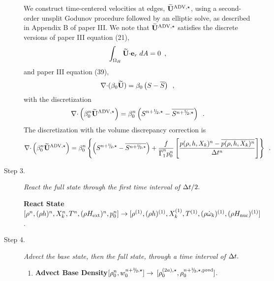 \begin{description}
We construct time-centered velocities at edges, $\widetilde{\mathbf{U}}^{\mathrm{ADV},\star}$, 
using a second-order unsplit Godunov procedure followed by an elliptic
solve, as described in Appendix B of paper III.  We note that 
$\widetilde{\mathbf{U}}^{\mathrm{ADV},\star}$ satisfies the discrete versions of paper III equation (21),
\begin{equation}
\int_{\Omega_H} \widetilde{{\bf U}} \mathbf{\cdot} \mathbf{e}_r \; dA = 0 \label{eq:udoterzero} \enskip ,
\end{equation}
and paper III equation (39),
\begin{equation}
\mathbf{\nabla} \mathbf{\cdot} (\beta_0 \widetilde{{\bf U}} )  = \beta_0 \left(S - \overline{S} \right )\enskip ,
\label{eq:tildeconstraint}
\end{equation}
with the discretization
\begin{equation}
\nablab \cdotb \left(\beta_0^n \uadvone\right) = 
\beta_0^n \left(S^{\nph,\star} - \overline{S^{\nph,\star}}\right) \enskip .
\end{equation}
The discretization with the volume discrepancy correction is
\begin{equation}
\nablab \cdotb \left(\beta_0^n \uadvone\right) = 
\beta_0^n \left\{ \left(S^{\nph,\star} - \overline{S^{\nph,\star}}\right)
+ \frac{f}{\gammabar^n p_0^n}
\left[\frac{p(\rho,h,X_k)^n - \overline{p(\rho,h,X_k)^n}}{\Delta t^n}\right]\right\} \enskip .
\end{equation}

\item[Step 3.] {\em React the full state through the first time interval of $\Delta t / 2.$}

{\bf React State}$[\rho^n, (\rho h)^n, X_k^n, T^n, (\rho{H_{\rm ext}})^n, p_0^n] \rightarrow
[ \rho^{(1)},(\rho h)^{(1)},X_k^{(1)},T^{(1)},(\rho \dot{\omega}_k)^{(1)},(\rho {H_{\rm nuc}})^{(1)} ]$.

\item[Step 4.] {\em Advect the base state, then the full state, through a time interval 
of $\Delta t.$}

\begin{enumerate}
\renewcommand{\theenumi}{{\bf \alph{enumi}}}

\item {\bf Advect Base Density}$[\rhozero^{n},w_0^{\nph,\star}] \rightarrow$ 
$[\rho_0^{(2a),\star}, \rho_0^{\nph,\star,{\rm pred}}]$.


\end{enumerate}
\end{description}
